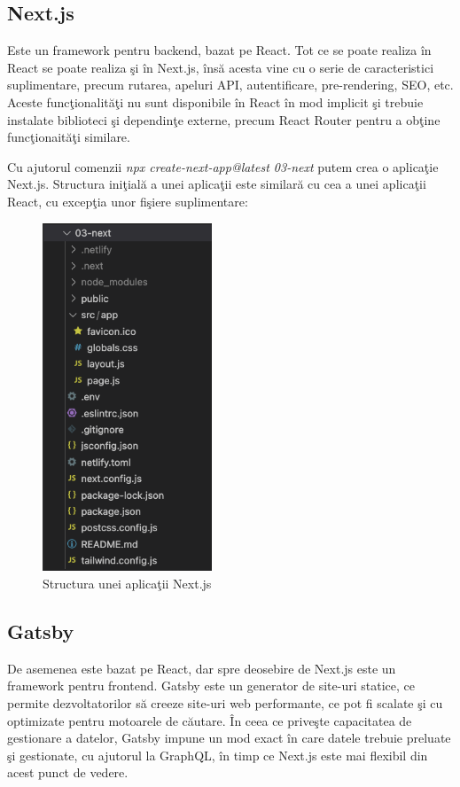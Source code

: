 \documentclass[12pt, a4paper]{report}
\begin{document}
\subsection{Next.js}
Este un framework pentru backend, bazat pe React. Tot ce se poate realiza \^in React se poate realiza \c si \^in Next.js, \^ins\u a acesta vine cu o serie de caracteristici suplimentare, precum rutarea, apeluri API, autentificare, pre-rendering, SEO, etc. Aceste func\c tionalit\u a\c ti nu sunt disponibile \^in React \^in mod implicit \c si trebuie instalate biblioteci \c si dependin\c te externe, precum React Router pentru a ob\c tine func\c tionait\u a\c ti similare.

Cu ajutorul comenzii \textit{npx create-next-app@latest 03-next} putem crea o aplica\c tie Next.js. Structura ini\c tial\u a a unei aplica\c tii este similar\u a cu cea a unei aplica\c tii React, cu excep\c tia unor fi\c siere suplimentare:
\begin{figure}[htbp]
	\centering
	\includegraphics[width=0.45\textwidth]{next_file_structure.png}
	\caption{Structura unei aplica\c tii Next.js}
	\label{fig:next-structure}
\end{figure}


\subsection{Gatsby}
De asemenea este bazat pe React, dar spre deosebire de Next.js este un framework pentru frontend. Gatsby este un generator de site-uri statice, ce permite dezvoltatorilor s\u a creeze site-uri web performante, ce pot fi scalate \c si cu optimizate pentru motoarele de c\u autare. \^In ceea ce prive\c ste capacitatea de gestionare a datelor, Gatsby impune un mod exact \^in care datele trebuie preluate \c si gestionate, cu ajutorul la GraphQL, \^in timp ce Next.js este mai flexibil din acest punct de vedere.
\end{document}
